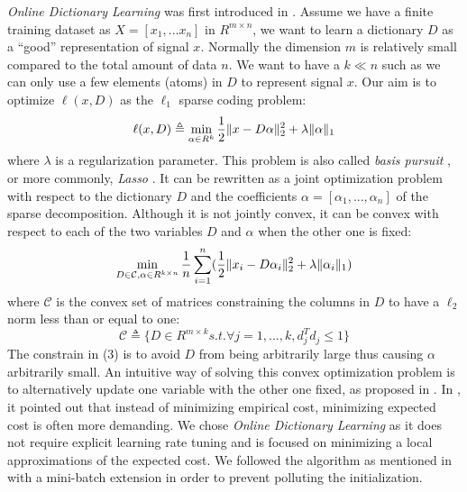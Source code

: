\documentclass[conference]{IEEEtran}
\begin{document}
\textit{Online Dictionary Learning} was first introduced in \cite{b4}. Assume we have a finite training dataset as $ X=[x_1,...x_n] $ in $R^{m\times n}$, we want to learn a dictionary $D$ as a ``good'' representation of signal $x$. Normally the dimension $m$ is relatively small compared to the total amount of data $n$. We want to have a $k\ll n$ such as we can only use a few elements (atoms) in $D$ to represent signal $x$. Our aim is to optimize $\ell(x, D)$ as the $\ell_{1}$ sparse coding problem:
\begin{equation}
\ell(x, D) \triangleq \min\limits_{\alpha \in R^k} \frac{1}{2}\Arrowvert x-D\alpha \Arrowvert^{2}_{2}+\lambda\Arrowvert \alpha \Arrowvert_{1}
\end{equation}
where $ \lambda $ is a regularization parameter. This problem is also called \textit{basis pursuit} \cite{b6}, or more commonly, \textit{Lasso}  \cite{b7}. It can be rewritten as a joint optimization problem with respect to the dictionary $D$ and the coefficients $\alpha=[\alpha_1,...,\alpha_n]$ of the
sparse decomposition. Although it is not jointly convex, it can be convex with respect to each of the two variables $D$ and $\alpha$ when
the other one is fixed:
\begin{equation}
\min\limits_{D\in \mathcal{C} ,  \alpha \in R^{k\times n}} \frac{1}{n}\sum\limits_{i=1}^n (\frac{1}{2}\Arrowvert x_{i}-D\alpha_{i} \Arrowvert^{2}_{2}+\lambda\Arrowvert \alpha_{i} \Arrowvert_{1}) 
\end{equation}
where $\mathcal{C}$ is the convex set of matrices constraining the columns in $D$ to have a $\ell_{2}$ norm less than or equal to one:
\begin{equation}
\mathcal{C} \triangleq \{D\in R^{m\times k} s.t. \forall j=1,...,k, d^T_{j}d_{j} \le 1\}
\end{equation}
The constrain in (3) is to avoid $D$ from being arbitrarily large thus causing $\alpha$ arbitrarily small.
An intuitive way of solving this convex optimization problem is to alternatively update one variable with the other one fixed, as proposed in \cite{b8}. In \cite{b9}, it pointed out that instead of minimizing empirical cost, minimizing expected cost is often more demanding. We chose \textit{Online Dictionary Learning} as it does not require explicit learning
rate tuning and is focused on minimizing a local approximations of the expected cost. We followed the algorithm as mentioned in \cite{b4} with a mini-batch extension in order to prevent polluting the initialization. 
\end{document}
